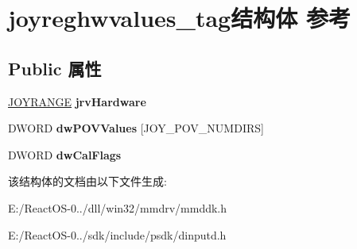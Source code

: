 \hypertarget{structjoyreghwvalues__tag}{}\section{joyreghwvalues\+\_\+tag结构体 参考}
\label{structjoyreghwvalues__tag}
\subsection*{Public 属性}
\begin{DoxyCompactItemize}
\item 
\mbox{\label{structjoyreghwvalues__tag_aebd9223a0da9f439c6fa5071b91d1441}} 
\hyperlink{structjoyrange__tag}{J\+O\+Y\+R\+A\+N\+GE} {\bfseries jrv\+Hardware}
\item 
\mbox{\label{structjoyreghwvalues__tag_a4e8f860969d6fb04f2aa7aa7b2dbbc0d}} 
D\+W\+O\+RD {\bfseries dw\+P\+O\+V\+Values} \mbox{[}J\+O\+Y\+\_\+\+P\+O\+V\+\_\+\+N\+U\+M\+D\+I\+RS\mbox{]}
\item 
\mbox{\label{structjoyreghwvalues__tag_a00dfef6a919370bdb25af1660be48f7f}} 
D\+W\+O\+RD {\bfseries dw\+Cal\+Flags}
\end{DoxyCompactItemize}


该结构体的文档由以下文件生成\+:\begin{DoxyCompactItemize}
\item 
E\+:/\+React\+O\+S-\/0../dll/win32/mmdrv/mmddk.\+h\item 
E\+:/\+React\+O\+S-\/0../sdk/include/psdk/dinputd.\+h\end{DoxyCompactItemize}
